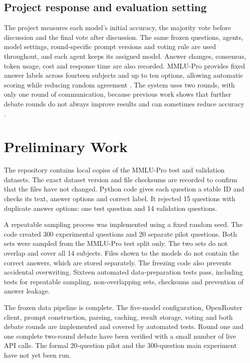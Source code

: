 \documentclass[12pt,a4paper]{article}
\begin{document}
\subsection{Project response and evaluation setting}

The project measures each model's initial accuracy, the majority vote before
discussion and the final vote after discussion. The same frozen questions,
agents, model settings, round-specific prompt versions and voting rule are used
throughout, and each agent keeps its assigned model. Answer changes, consensus,
token usage, cost and response time are also recorded. MMLU-Pro provides fixed answer labels across fourteen subjects and up
to ten options, allowing automatic scoring while reducing random agreement
\citep{wang2024mmlupro}.
The system uses two rounds, with only one round of communication, because
previous work shows that further debate rounds do not always improve results
and can sometimes reduce accuracy \citep{choi2025debate,li2026m3mad}.

\section{Preliminary Work}
\label{sec:preliminary}

The repository contains local copies of the MMLU-Pro test and validation
datasets. The exact dataset version and file checksums are recorded to confirm
that the files have not changed. Python code gives each question a stable ID and
checks its text, answer options and correct label. It rejected 15 questions with
duplicate answer options: one test question and 14 validation questions.

A repeatable sampling process was implemented using a fixed random seed. The
code created 300 experimental questions and 20 separate pilot questions. Both sets were sampled from the MMLU-Pro test split only. The
two sets do not overlap and cover all 14 subjects. Files shown to the models do
not contain the correct answers, which are stored separately. The freezing code
also prevents accidental overwriting. Sixteen automated data-preparation tests
pass, including
tests for repeatable sampling, non-overlapping sets, checksums and prevention of
answer leakage.

The frozen data pipeline is complete. The five-model configuration,
OpenRouter client, prompt construction, parsing, caching, result storage,
voting and both debate rounds are implemented and covered by automated
tests. Round one and one complete two-round debate have been verified with
a small number of live API calls. The formal 20-question pilot and the
300-question main experiment have not yet been run.
\end{document}
